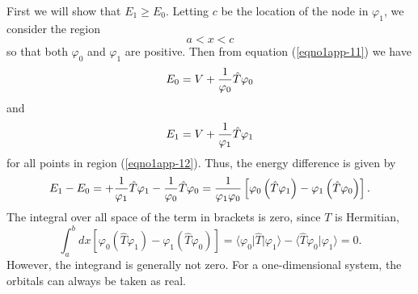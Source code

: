First we will show that $E_1 \geq E_0$. Letting $c$ be the location of the node
in $\varphi_1$, we consider the region
\begin{equation}
a < x < c
\label{eqno1app-12}
\end{equation}
so that both $\varphi_0$ and $\varphi_1$ are positive. Then from
equation (\ref{eqno1app-11}) we have
\begin{equation}
E_0 = V + {1 \over \varphi_0} {\hat T} \varphi_0
\end{equation}
and
\begin{equation}
E_1 = V + {1 \over \varphi_1} {\hat T} \varphi_1
\end{equation}
for all points in region (\ref{eqno1app-12}). Thus, the energy
difference is given by
\begin{equation}
E_1 - E_0 = + {1 \over \varphi_1} {\hat T} \varphi_1 - {1 \over 
\varphi_0} {\hat T} \varphi_0 = {1 \over \varphi_1 \varphi_0} \left[ 
\varphi_0 \left( {\hat T} \varphi_1 \right) - \varphi_1 \left( {\hat 
T} \varphi_0 \right) \right].
\label{eqno1app-13}
\end{equation}
The integral over all space of the term in brackets is zero, since $T$ is 
Hermitian,
\begin{equation}
\int^{b}_{a} d x \left[ \varphi_0 \left( {\hat T} \varphi_1 
\right) - \varphi_1 \left( {\hat T} \varphi_0 \right) \right] = \langle 
\varphi_0 \vert {\hat T} \vert \varphi_1 \rangle - \langle {\hat T} \varphi_0 
\vert \varphi_1 \rangle = 0 .
\end{equation}
However, the integrand is generally not zero. For a one-dimensional system, 
the orbitals can always be taken as real.
    
